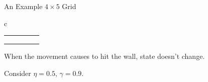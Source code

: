\documentclass[aspectratio=169,xcolor=dvipsnames,svgnames,x11names,fleqn]{beamer}
\begin{document}
\begin{frame}{An Example $4\times 5$ Grid}
\begin{center}
\begin{tabular}{c}
        \begin{tabular}{|c|c|c|c|c|}
            \hline
            \perparrows{0.5}{0.5}{0.5pt}{1.5mm}{blue}{red} &  \perparrows{0.5}{0.5}{0.5pt}{1.5mm}{blue}{red} &  \perparrows{0.5}{0.5}{0.5pt}{1.5mm}{blue}{red} & \perparrows{0.5}{0.5}{0.5pt}{1.5mm}{blue}{red}  & \cellcolor{red!25} \\ %
            \hline
            \perparrows{0.5}{0.5}{0.5pt}{1.5mm}{blue}{red} &  \perparrows{0.5}{0.5}{0.5pt}{1.5mm}{blue}{red} & \cellcolor{black}  &  \perparrows{0.5}{0.5}{0.5pt}{1.5mm}{blue}{red} &  \perparrows{0.5}{0.5}{0.5pt}{1.5mm}{blue}{red}  \\ 
            \hline
            \perparrows{0.5}{0.5}{0.5pt}{1.5mm}{blue}{red} &  \perparrows{0.5}{0.5}{0.5pt}{1.5mm}{blue}{red} &  \perparrows{0.5}{0.5}{0.5pt}{1.5mm}{blue}{red} &  \perparrows{0.5}{0.5}{0.5pt}{1.5mm}{blue}{red} & \perparrows{0.5}{0.5}{0.5pt}{1.5mm}{blue}{red}\\ %
            \hline
            \perparrows{0.5}{0.5}{0.5pt}{1.5mm}{blue}{red} &  \perparrows{0.5}{0.5}{0.5pt}{1.5mm}{blue}{red}  &  \perparrows{0.5}{0.5}{0.5pt}{1.5mm}{blue}{red} & \perparrows{0.5}{0.5}{0.5pt}{1.5mm}{blue}{red} & \cellcolor{red!25}  \\ %
            \hline
        \end{tabular}
    \end{tabular}

        When the movement causes to hit the wall, state doesn't change.

        Consider $\eta = 0.5$, $\gamma = 0.9$.
    \end{center}
\end{frame}
\end{document}
